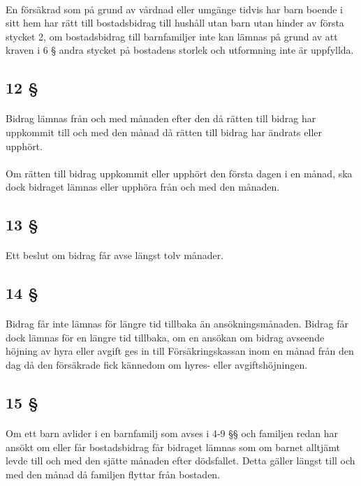 \documentclass[a4paper,notitlepage,openany,10pt]{book}
\begin{document}
\paragraph*{}
En försäkrad som på grund av vårdnad eller umgänge tidvis har barn boende i sitt hem har rätt till bostadsbidrag till hushåll utan barn utan hinder av första stycket 2, om bostadsbidrag till barnfamiljer inte kan lämnas på grund av att kraven i 6 § andra stycket på bostadens storlek och utformning inte är uppfyllda.
\subsection*{12 §}
\paragraph*{}
Bidrag lämnas från och med månaden efter den då rätten till bidrag har uppkommit till och med den månad då rätten till bidrag har ändrats eller upphört.
\paragraph*{}
Om rätten till bidrag uppkommit eller upphört den första dagen i en månad, ska dock bidraget lämnas eller upphöra från och med den månaden.
\subsection*{13 §}
\paragraph*{}
Ett beslut om bidrag får avse längst tolv månader.
\subsection*{14 §}
\paragraph*{}
Bidrag får inte lämnas för längre tid tillbaka än ansökningsmånaden. Bidrag får dock lämnas för en längre tid tillbaka, om en ansökan om bidrag avseende höjning av hyra eller avgift ges in till Försäkringskassan inom en månad från den dag då den försäkrade fick kännedom om hyres- eller avgiftshöjningen.
\subsection*{15 §}
\paragraph*{}
Om ett barn avlider i en barnfamilj som avses i 4-9 §§ och familjen redan har ansökt om eller får bostadsbidrag får bidraget lämnas som om barnet alltjämt levde till och med den sjätte månaden efter dödsfallet. Detta gäller längst till och med den månad då familjen flyttar från bostaden.
\end{document}
